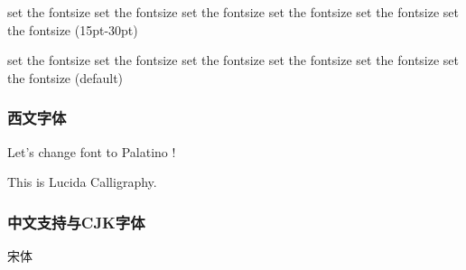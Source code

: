 \documentclass[twoside]{ctexart} %
\begin{document}
            {\fontsize{15}{30}\selectfont set the fontsize set the fontsize set the fontsize set the fontsize set the fontsize set the fontsize (15pt-30pt)\par}

            set the fontsize set the fontsize set the fontsize set the fontsize set the fontsize set the fontsize (default)


        \subsubsection{西文字体}
            \newcommand*{\myfont}[2]{{\fontfamily{#1}\selectfont #2}}
            Let's change font to \myfont{lmss}{Palatino} !

            {\lucida This is Lucida Calligraphy.}


        \subsubsection{中文支持与CJK字体}
            {\songti 宋体}
\end{document}
